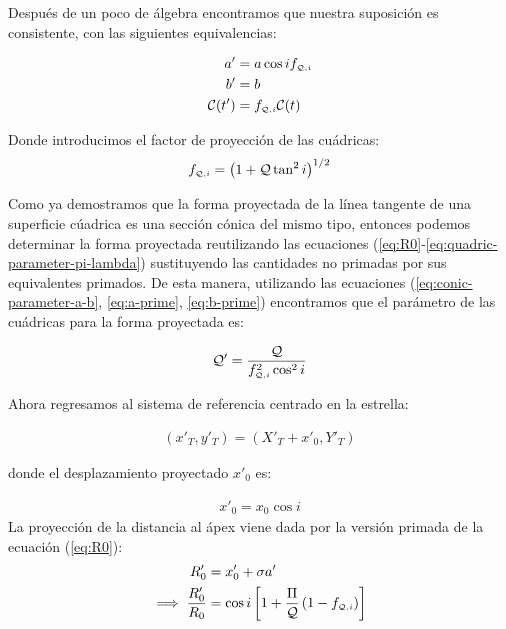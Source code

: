 Después de un poco de álgebra encontramos que nuestra suposición es consistente, con las siguientes equivalencias:

\begin{align}
  a' &= a\cos i f_{\scriptscriptstyle \mathcal{Q}, i} \label{eq:a-prime}\\
  b' &= b \label{eq:b-prime}\\
  \mathcal{C}(t') &= f_{\scriptscriptstyle \mathcal{Q}, i} \mathcal{C}(t)
\end{align}

Donde introducimos el factor de proyección de las cuádricas:
\begin{align}
  f_{\scriptscriptstyle \mathcal{Q}, i} = \left(1 + \mathcal{Q}\tan^2i\right)^{1/2}
\end{align}


Como ya demostramos que la forma proyectada de la línea tangente de una superficie cúadrica es una sección cónica del mismo tipo, entonces podemos determinar la forma proyectada reutilizando las ecuaciones (\ref{eq:R0}-\ref{eq:quadric-parameter-pi-lambda}) sustituyendo las cantidades no primadas por sus equivalentes primados. De esta manera, utilizando las ecuaciones (\ref{eq:conic-parameter-a-b}, \ref{eq:a-prime}, \ref{eq:b-prime}) encontramos que el parámetro de las cuádricas para la forma proyectada es:

\begin{align}
  \mathcal{Q}' = \frac{\mathcal{Q}}{f_{\scriptscriptstyle \mathcal{Q}, i}^2 \cos^2 i}\label{eq:Q-prime}
\end{align}

Ahora regresamos al sistema de referencia centrado en la estrella:

\begin{align}
  (x'_T, y'_T) = (X'_T + x'_0, Y'_T)
\end{align}

donde el desplazamiento proyectado $x'_0$ es:

\begin{align}
  x'_0 = x_0\cos i
\end{align}
La proyección de la distancia al ápex viene dada por la versión primada de la ecuación (\ref{eq:R0}):
\begin{align}
  R'_0 &=  x'_0 + \sigma a'\\
  \implies \frac{R'_0}{R_0} &= \cos i\left[1 + \frac{\Pi}{\mathcal{Q}}\left(1 - f_{\scriptscriptstyle \mathcal{Q}, i}\right)\right]
\end{align}

